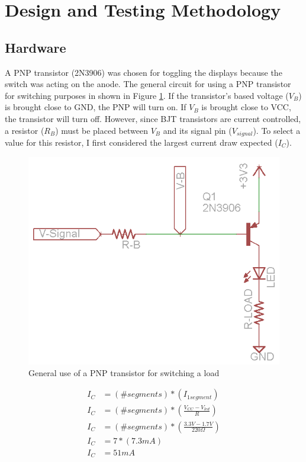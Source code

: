 \documentclass[11pt]{article}
\begin{document}
\section{Design and Testing Methodology}


\subsection{Hardware}

A PNP transistor (2N3906) was chosen for toggling the displays because the switch was acting on the anode. The general circuit for using a PNP transistor for switching purposes in shown in Figure \ref{fig:bjt}. If the transistor's based voltage ($V_B$) is brought close to GND, the PNP will turn on. If $V_B$ is brought close to VCC, the transistor will turn off. However, since BJT transistors are current controlled, a resistor ($R_{B}$) must be placed between $V_B$ and its signal pin ($V_{signal}$). To select a value for this resistor, I first considered the largest current draw expected ($I_C$).

\begin{figure}[h!]
\centering
\includegraphics[scale=0.5]{bjt.png}
\caption{General use of a PNP transistor for switching a load}
\label{fig:bjt}
\end{figure} 

\begin{align*}
I_{C} &= (\# segments)*(I_{1segment}) \\
I_{C} &= (\# segments)*(\frac{V_{CC}-V_{led}}{R}) \\
I_{C} &= (\# segments)*(\frac{3.3V-1.7V}{220\Omega}) \\
I_{C} &= 7*(7.3mA) \\
I_{C} &= 51mA
\end{align*}
\end{document}

